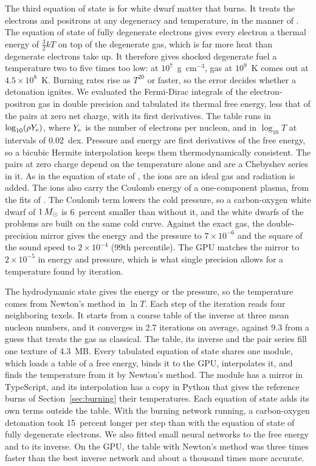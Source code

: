 \documentclass[twocolumn]{aastex701}
\begin{document}
The third equation of state is for white dwarf matter that burns. It treats the electrons and positrons at any degeneracy and temperature, in the manner of \citet{TimmesSwesty2000}. The equation of state of fully degenerate electrons gives every electron a thermal energy of $\frac{3}{2}kT$ on top of the degenerate gas, which is far more heat than degenerate electrons take up. It therefore gives shocked degenerate fuel a temperature two to five times too low: at $10^7$~g~cm$^{-3}$, gas at $10^9$~K comes out at $4.5\times10^8$~K. Burning rates rise as $T^{20}$ or faster, so the error decides whether a detonation ignites. We evaluated the Fermi-Dirac integrals of the electron-positron gas in double precision and tabulated its thermal free energy, less that of the pairs at zero net charge, with its first derivatives. The table runs in $\log_{10}(\rho Y_{\rm e})$, where $Y_{\rm e}$ is the number of electrons per nucleon, and in $\log_{10} T$ at intervals of 0.02~dex. Pressure and energy are first derivatives of the free energy, so a bicubic Hermite interpolation keeps them thermodynamically consistent. The pairs at zero charge depend on the temperature alone and are a Chebyshev series in it. As in the equation of state of \citet{TimmesSwesty2000}, the ions are an ideal gas and radiation is added. The ions also carry the Coulomb energy of a one-component plasma, from the fits of \citet{YakovlevShalybkov1989}. The Coulomb term lowers the cold pressure, so a carbon-oxygen white dwarf of $1\,M_\odot$ is 6~percent smaller than without it, and the white dwarfs of the problems are built on the same cold curve. Against the exact gas, the double-precision mirror gives the energy and the pressure to $7\times10^{-6}$ and the square of the sound speed to $2\times10^{-4}$ (99th percentile). The GPU matches the mirror to $2\times10^{-5}$ in energy and pressure, which is what single precision allows for a temperature found by iteration.

The hydrodynamic state gives the energy or the pressure, so the temperature comes from Newton's method in $\ln T$. Each step of the iteration reads four neighboring texels. It starts from a coarse table of the inverse at three mean nucleon numbers, and it converges in 2.7 iterations on average, against 9.3 from a guess that treats the gas as classical. The table, its inverse and the pair series fill one texture of 4.3~MB. Every tabulated equation of state shares one module, which loads a table of a free energy, binds it to the GPU, interpolates it, and finds the temperature from it by Newton's method. The module has a mirror in TypeScript, and its interpolation has a copy in Python that gives the reference burns of Section~\ref{sec:burning} their temperatures. Each equation of state adds its own terms outside the table. With the burning network running, a carbon-oxygen detonation took 15~percent longer per step than with the equation of state of fully degenerate electrons. We also fitted small neural networks to the free energy and to its inverse. On the GPU, the table with Newton's method was three times faster than the best inverse network and about a thousand times more accurate.
\end{document}
